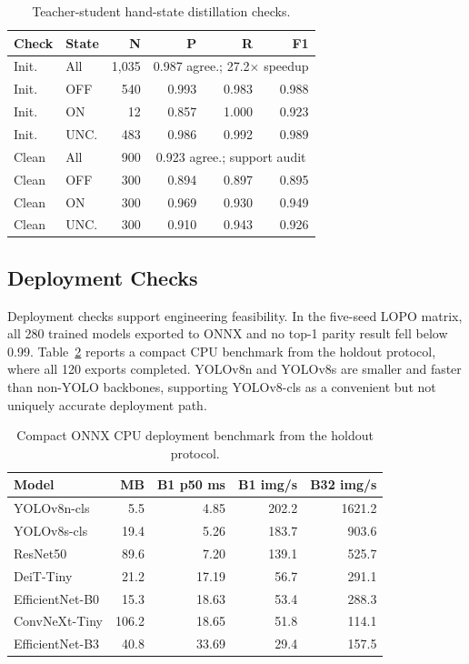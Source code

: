 \documentclass[sigconf,review,anonymous]{acmart}
\newcommand{\autouitablefont}{\footnotesize}
\begin{document}
\begin{table}[t]
\centering
\caption{Teacher-student hand-state distillation checks.}
\label{tab:wheel_distill}
\autouitablefont
\begin{tabular}{llrrrr}
\toprule
Check & State & N & P & R & F1 \\
\midrule
Init. & All & 1,035 & \multicolumn{3}{c}{0.987 agree.; 27.2$\times$ speedup} \\
Init. & OFF & 540 & 0.993 & 0.983 & 0.988 \\
Init. & ON & 12 & 0.857 & 1.000 & 0.923 \\
Init. & UNC. & 483 & 0.986 & 0.992 & 0.989 \\
Clean & All & 900 & \multicolumn{3}{c}{0.923 agree.; support audit} \\
Clean & OFF & 300 & 0.894 & 0.897 & 0.895 \\
Clean & ON & 300 & 0.969 & 0.930 & 0.949 \\
Clean & UNC. & 300 & 0.910 & 0.943 & 0.926 \\
\bottomrule
\end{tabular}
\end{table}

\subsection{Deployment Checks}

Deployment checks support engineering feasibility. In the five-seed LOPO
matrix, all 280 trained models exported to ONNX and no top-1 parity
result fell below 0.99. Table~\ref{tab:deployment} reports a compact CPU
benchmark from the holdout protocol, where all 120 exports completed.
YOLOv8n and YOLOv8s are smaller and faster than non-YOLO backbones,
supporting YOLOv8-cls as a convenient but not uniquely accurate
deployment path.

\begin{table}[t]
\centering
\caption{Compact ONNX CPU deployment benchmark from the holdout protocol.}
\label{tab:deployment}
\autouitablefont
\begin{tabular}{lrrrr}
\toprule
Model & MB & B1 p50 ms & B1 img/s & B32 img/s \\
\midrule
YOLOv8n-cls & 5.5 & 4.85 & 202.2 & 1621.2 \\
YOLOv8s-cls & 19.4 & 5.26 & 183.7 & 903.6 \\
ResNet50 & 89.6 & 7.20 & 139.1 & 525.7 \\
DeiT-Tiny & 21.2 & 17.19 & 56.7 & 291.1 \\
EfficientNet-B0 & 15.3 & 18.63 & 53.4 & 288.3 \\
ConvNeXt-Tiny & 106.2 & 18.65 & 51.8 & 114.1 \\
EfficientNet-B3 & 40.8 & 33.69 & 29.4 & 157.5 \\
\bottomrule
\end{tabular}
\end{table}
\end{document}
